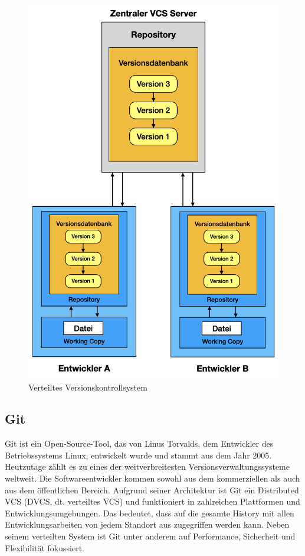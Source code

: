 \begin{itemize}
	\begin{figure}[H]
	\begin{center}
		\includegraphics[scale=.6]{images/distributed_vcs.png}
	\end{center}
		\caption{Verteiltes Versionskontrollsystem}
	\end{figure}
\end{itemize}

\subsection{Git}
Git \cite{git_2020} ist ein Open-Source-Tool, das von Linus Torvalds, dem Entwickler des Betriebssystems Linux, entwickelt wurde und stammt aus dem Jahr 2005. Heutzutage zählt es zu eines der weitverbreitesten Versionsverwaltungssysteme weltweit. Die Softwareentwickler kommen sowohl aus dem kommerziellen als auch aus dem öffentlichen Bereich. Aufgrund seiner Architektur ist Git ein Distributed VCS (DVCS, dt. verteiltes VCS) und funktioniert in zahlreichen Plattformen und Entwicklungsumgebungen. Das bedeutet, dass auf die gesamte History mit allen Entwicklungsarbeiten von jedem Standort aus zugegriffen werden kann. Neben seinem verteilten System ist Git unter anderem auf Performance, Sicherheit und Flexibilität fokussiert.

